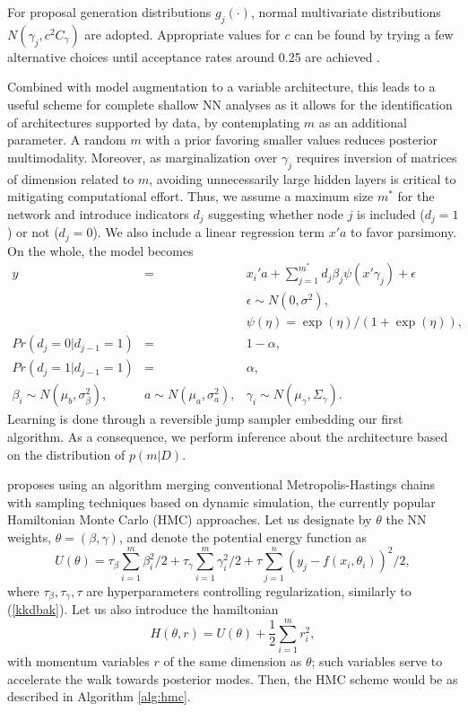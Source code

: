 \noindent For proposal generation distributions $g_j(\cdot)$,
normal multivariate distributions
$N(\gamma_j,c^2 C_\gamma)$ are 
adopted. %
Appropriate values for $c$ can be found by trying
a few alternative choices until acceptance rates around
 0.25 are achieved \parencite{gamerman}. 

Combined with model augmentation to a variable architecture,
 this leads to a useful scheme
for complete shallow NN analyses as it allows for 
the identification of
architectures supported by data, by  
contemplating $m$ as an additional parameter.
A random $m$ with a prior 
favoring smaller values reduces posterior multimodality.
Moreover, as marginalization over $\gamma_ j$ requires inversion of matrices
of dimension related to $m$, 
avoiding unnecessarily large
hidden layers is critical to
mitigating computational effort.
 Thus, we assume 
a maximum size $m^*$ for the network and introduce 
indicators  $d_j$ suggesting whether node
$j$ is included ($d_j=1$) or not ($d_j=0$). 
We  also 
include a linear regression term $x'a$
to favor parsimony. On the whole, the model
becomes 
\begin{eqnarray*}
  y          & = & x_i'a + \sum_{j=1}^{m^*} d_j\beta_j \psi(x '\gamma_j) +
                    \epsilon \\ %
                    & & \epsilon \sim N(0,\sigma^2),\nonumber \\
                    & &    \psi(\eta) = \exp(\eta)/(1+\exp(\eta)),
                        \nonumber \\
  Pr(d_j=0|d_{j-1}=1)   & = & 1-\alpha, \nonumber\\
  Pr(d_j=1|d_{j-1}=1)   & = & \alpha, \nonumber\\
  \beta_i    \sim  N(\mu_b,\sigma_\beta^2),& 
  a     \sim  N(\mu_a,\sigma_a^2), &   \gamma_i   \sim  N(\mu_\gamma,\Sigma_\gamma).
                \label{eq:model-var}
\end{eqnarray*}
Learning is done through a reversible jump sampler
\parencite{green} embedding our first algorithm.
As a consequence, we perform inference
about the architecture based on the distribution of 
 $p(m|D)$. 

 \parencite{neal2012bayesian} proposes using an 
algorithm merging conventional Metropolis-Hastings chains with sampling
techniques based on dynamic simulation, the currently popular
Hamiltonian Monte Carlo (HMC) approaches.
Let us designate by $\theta$ the NN 
weights, $\theta = (\beta, \gamma)$, and denote the potential energy function as
$$
U(\theta) = \tau_{\beta}\sum_{i=1}^m \beta_i^2/2 + \tau_{\gamma} \sum_{i=1}^m \gamma_i^2/2 + \tau \sum_{j=1}^n (y_j - f(x_i, \theta_i))^2/2,
$$
where $\tau_{\beta}, \tau_{\gamma}, \tau$ are hyperparameters 
controlling regularization, similarly to (\ref{kkdbak}). 
Let us also introduce the hamiltonian 
$$
H(\theta, r) = U(\theta) + \frac{1}{2} \sum_{i=1}^m r_i^2,
$$
with momentum variables $r$ of the same dimension as $\theta$; such 
 variables serve to accelerate the walk towards posterior modes. Then, the HMC scheme would be as described in Algorithm \ref{alg:hmc}.

